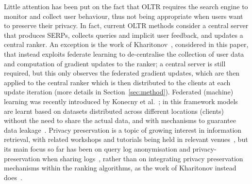 Little attention has been put on the fact that OLTR requires the search engine to monitor and collect user behaviour, thus not being appropriate when users want to preserve their privacy. In fact, current OLTR methods consider a central server that produces SERPs, collects queries and implicit user feedback, and updates a central ranker. An exception is the work of Kharitonov~\cite{kharitonov2019federated}, considered in this paper, that instead exploits federate learning to de-centralise the collection of user data and computation of gradient updates to the ranker; a central server is still required, but this only observes the federated gradient updates, which are then applied to the central ranker which is then distributed to the clients at each update iteration (more details in Section~\ref{sec:method}). Federated (machine) learning was recently introduced by Konecny et al.~\cite{DBLP:journals/corr/KonecnyMRR16,DBLP:journals/corr/KonecnyMYRSB16}; in this framework models are learnt based on datasets distributed across different locations (clients) without the need to share the actual data, and with mechanisms to guarantee data leakage~\cite{yang2019federated}. 
Privacy preservation is a topic of growing interest in information retrieval, with related workshops and tutorials being held in relevant venues~\cite{yang2016privacy,yang2017differential}, but its main focus so far has been on query log anonymisation and privacy-preservation when sharing logs~\cite{cooper2008survey,korolova2009releasing,zhang2016anonymizing}, rather than on integrating privacy preservation mechanisms within the ranking algorithms, as the work of Kharitonov instead does~\cite{kharitonov2019federated}.

%
%
%

